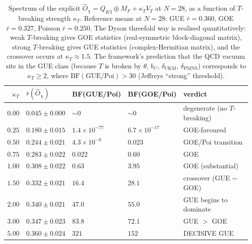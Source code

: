 \documentclass[11pt,a4paper]{article}
\newcommand{\Opchi}{\hat{O}_\chi}
\theoremstyle{plain}
\theoremstyle{definition}
\theoremstyle{remark}
\begin{document}
\begin{table}[h]
\centering
\small
\begin{tabular}{r l l l l}
\toprule
$\kappa_T$ & $\bar r(\Opchi)$ & BF(GUE/Poi) & BF(GOE/Poi) & verdict \\
\midrule
$0.00$ & $0.045 \pm 0.000$ & $\sim 0$              & $\sim 0$              & degenerate (no $T$-breaking) \\
$0.25$ & $0.180 \pm 0.015$ & $1.4 \times 10^{-77}$ & $6.7 \times 10^{-17}$ & GOE-favoured \\
$0.50$ & $0.244 \pm 0.021$ & $4.3 \times 10^{-6}$  & $0.023$               & GOE/Poi transition \\
$0.75$ & $0.283 \pm 0.022$ & $0.022$               & $0.60$                & GOE \\
$1.00$ & $0.308 \pm 0.022$ & $0.63$                & $3.95$                & GOE (substantial) \\
$1.50$ & $0.332 \pm 0.021$ & $16.4$                & $28.1$                & crossover (GUE $\sim$ GOE) \\
$2.00$ & $0.340 \pm 0.021$ & $47.0$                & $55.0$                & GUE begins to dominate \\
$3.00$ & $0.347 \pm 0.023$ & $83.8$                & $72.1$                & GUE $>$ GOE \\
$5.00$ & $0.360 \pm 0.024$ & $321$                 & $152$                 & DECISIVE GUE \\
\bottomrule
\end{tabular}
\caption{Spectrum of the explicit $\Opchi = Q_{K3} \oplus M_F +
\kappa_T V_T$ at $N = 28$, as a function of $T$-breaking strength
$\kappa_T$.  Reference means at $N = 28$: GUE $\bar r = 0.360$,
GOE $\bar r = 0.327$, Poisson $\bar r = 0.250$.  The Dyson
threefold way is realised quantitatively: weak $T$-breaking gives
GOE statistics (real-symmetric block-diagonal matrix), strong
$T$-breaking gives GUE statistics (complex-Hermitian matrix), and
the crossover occurs at $\kappa_T \approx 1.5$.  The framework's
prediction that the QCD vacuum sits in the GUE class (because $T$
is broken by $\theta$, $b_C$, $\delta_{\mathrm{CKM}}$,
$\delta_{\mathrm{PMNS}}$) corresponds to $\kappa_T \ge 2$, where
$\mathrm{BF}(\text{GUE}/\text{Poi}) > 30$ (Jeffreys ``strong''
threshold).}
\label{tab:ochi-sweep}
\end{table}
\end{document}

